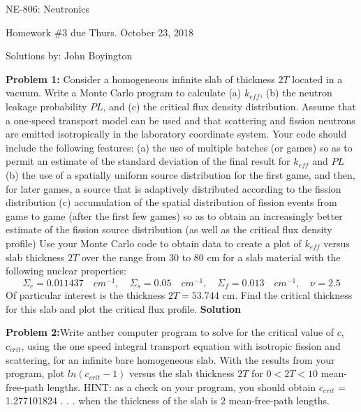 \documentclass{amsart}
\theoremstyle{definition}
\begin{document}
\LARGE{NE-806: Neutronics}
 
\large
Homework \#3 due Thurs. October 23, 2018
 
Solutions by: John Boyington
\newline
\bigskip
 
\textbf{Problem 1:} Consider a homogeneous infinite slab of thickness $2T$ located in a vacuum. Write a
Monte Carlo program to calculate (a) $k_{eff}$, (b) the neutron leakage probability $PL$, and (c) the critical flux density distribution. Assume that a one-speed transport model can be used and that scattering and fission neutrons are emitted isotropically in the laboratory coordinate system.
\bigbreak
Your code should include the following features:
\bigbreak
(a) the use of multiple batches (or games) so as to permit an estimate of the standard deviation of the final result for $k_{eff}$ and $PL$\newline
\bigbreak
(b) the use of a spatially uniform source distribution for the first game, and then, for later games, a source that is adaptively distributed according to the fission distribution\newline
\bigbreak
(c) accumulation of the spatial distribution of fission events from game to game (after the first few games) so as to obtain an increasingly better estimate of the fission source distribution (as well as the critical flux density profile)\newline
\bigbreak
Use your Monte Carlo code to obtain data to create a plot of $k_{eff}$ versus slab thickness $2T$ over the range from 30 to 80 cm for a slab material with the following nuclear properties:
\bigbreak
\begin{equation*}
    \Sigma_c = 0.011437\quad cm^{-1}, \quad \Sigma_s = 0.05\quad cm^{-1}, \quad \Sigma_f = 0.013\quad cm^{-1}, \quad \nu=2.5
\end{equation*}
\bigbreak
Of particular interest is the thickness $2T = 53.744$ cm. Find the critical thickness for this slab and plot the critical flux profile.
\bigbreak
\textbf{Solution}
 
\newpage
\textbf{Problem 2:}Write anther computer program to solve for the critical value of $c$, $c_{crit}$, using the one speed integral transport equation with isotropic fission and scattering, for an infinite bare homogeneous slab. With the results from your program, plot $ln (c_{crit} - 1)$ versus the slab thickness $2T$ for $0<2T<10$ mean-free-path lengths. HINT: as a check on your program, you should obtain $c_{crit}$ = 1.277101824 . . . when the thickness of the slab is 2 mean-free-path lengths.
\bigbreak
 
\end{document}
